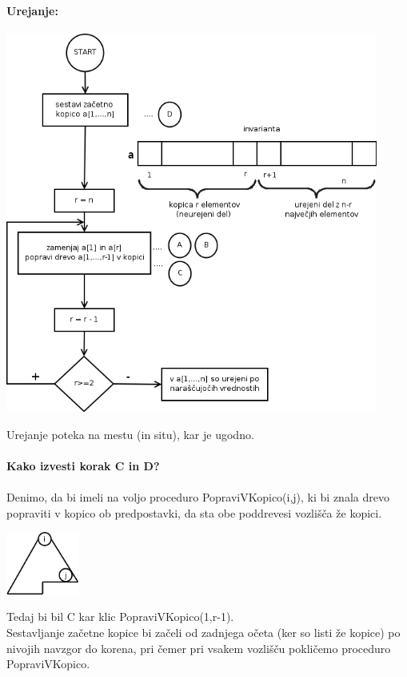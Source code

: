 \documentclass[a4paper,10pt]{article}
\begin{document}
\paragraph{Urejanje:}
\begin{center}
	\includegraphics[width=12.25cm,height=12.5cm]{Slike/HeapSortDiagram.png}
\end{center}
Urejanje poteka na mestu (in situ), kar je ugodno.\\
\\
\textbf{Kako izvesti korak C in D?}\\
\\
Denimo, da bi imeli na voljo proceduro PopraviVKopico(i,j), ki bi znala drevo popraviti v kopico ob predpostavki, da sta obe poddrevesi vozli\v s\v ca \v ze kopici.
	\begin{center}
	\includegraphics[width=2.4cm,height=2.05cm]{Slike/Poddrevo.png}
	\end{center}
Tedaj bi bil C kar klic PopraviVKopico(1,r-1).\\
Sestavljanje za\v cetne kopice bi za\v celi od zadnjega o\v ceta (ker so listi \v ze kopice) po nivojih navzgor do korena, pri \v cemer pri vsakem vozli\v s\v cu pokli\v cemo proceduro PopraviVKopico.
\end{document}
